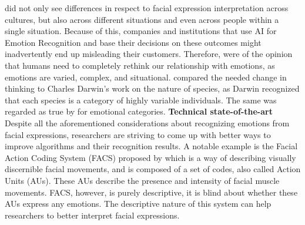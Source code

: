 \newline\newline
\citet{Barrett:2019:EmotionalFromFacialMovements} did not only see differences in respect to facial expression interpretation across cultures, but also across different situations and even across people within a single situation. Because of this, companies and institutions that use AI for Emotion Recognition and base their decisions on these outcomes might inadvertently end up misleading their customers. Therefore, \citet{Barrett:2019:EmotionalFromFacialMovements} were of the opinion that humans need to completely rethink our relationship with emotions, as emotions are varied, complex, and situational. \citet{Barrett:2019:EmotionalFromFacialMovements} compared the needed change in thinking to Charles Darwin's work on the nature of species, as Darwin recognized that each species is a category of highly variable individuals. The same was regarded as true by \citet{Barrett:2019:EmotionalFromFacialMovements} for emotional categories.
\newline\newline\newline
\textbf{Technical state-of-the-art}\newline
Despite all the aforementioned considerations about recognizing emotions from facial expressions, researchers are striving to come up with better ways to improve algorithms and their recognition results.
\newline\newline
A notable example is the Facial Action Coding System (FACS) proposed by \citet{Ekman:2002:FACS} which is a way of describing visually discernible facial movements, and is composed of a set of codes, also called Action Units (AUs). These AUs describe the presence and intensity of facial muscle movements. FACS, however, is purely descriptive, it is blind about whether these AUs express any emotions. The descriptive nature of this system can help researchers to better interpret facial expressions.

